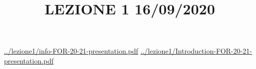 \title{LEZIONE 1 16/09/2020}\newline
\newline
\url{../lezione1/info-FOR-20-21-presentation.pdf}\newline
\url{../lezione1/Introduction-FOR-20-21-presentation.pdf}\newline
